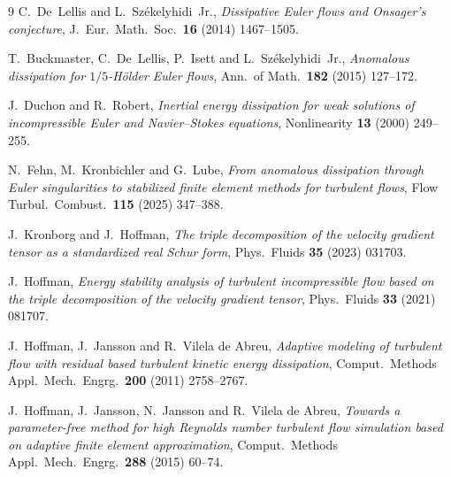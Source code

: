 \documentclass[11pt]{article}
\begin{document}
\begin{thebibliography}{9}
 C.~De~Lellis and L.~Sz\'ekelyhidi~Jr., \emph{Dissipative Euler flows and Onsager's
conjecture}, J.\ Eur.\ Math.\ Soc.\ \textbf{16} (2014) 1467--1505.

 T.~Buckmaster, C.~De~Lellis, P.~Isett and L.~Sz\'ekelyhidi~Jr., \emph{Anomalous
dissipation for $1/5$-H\"older Euler flows}, Ann.\ of Math.\ \textbf{182} (2015) 127--172.

 J.~Duchon and R.~Robert, \emph{Inertial energy dissipation for weak solutions
of incompressible Euler and Navier--Stokes equations}, Nonlinearity \textbf{13} (2000) 249--255.

 N.~Fehn, M.~Kronbichler and G.~Lube, \emph{From anomalous dissipation through Euler
singularities to stabilized finite element methods for turbulent flows}, Flow Turbul.\ Combust.\
\textbf{115} (2025) 347--388.

 J.~Kronborg and J.~Hoffman, \emph{The triple decomposition of the velocity gradient
tensor as a standardized real Schur form}, Phys.\ Fluids \textbf{35} (2023) 031703.

 J.~Hoffman, \emph{Energy stability analysis of turbulent incompressible flow based
on the triple decomposition of the velocity gradient tensor}, Phys.\ Fluids \textbf{33} (2021) 081707.

 J.~Hoffman, J.~Jansson and R.~Vilela de Abreu, \emph{Adaptive modeling of turbulent
flow with residual based turbulent kinetic energy dissipation}, Comput.\ Methods Appl.\ Mech.\
Engrg.\ \textbf{200} (2011) 2758--2767.

 J.~Hoffman, J.~Jansson, N.~Jansson and R.~Vilela de Abreu, \emph{Towards a
parameter-free method for high Reynolds number turbulent flow simulation based on adaptive finite
element approximation}, Comput.\ Methods Appl.\ Mech.\ Engrg.\ \textbf{288} (2015) 60--74.


\end{thebibliography}
\end{document}
